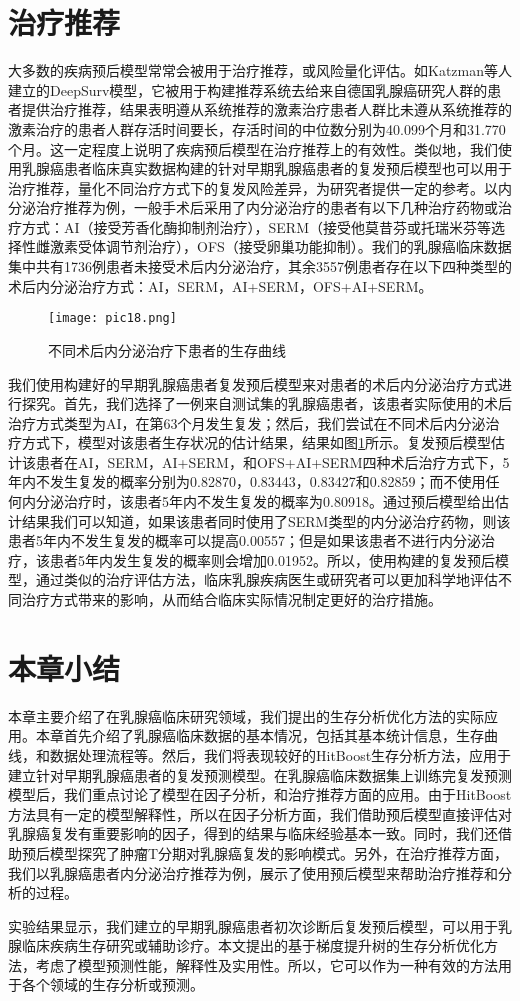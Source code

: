 \section{治疗推荐}
大多数的疾病预后模型常常会被用于治疗推荐，或风险量化评估。如Katzman等人 建立的DeepSurv模型，它被用于构建推荐系统去给来自德国乳腺癌研究人群的患者提供治疗推荐，结果表明遵从系统推荐的激素治疗患者人群比未遵从系统推荐的激素治疗的患者人群存活时间要长，存活时间的中位数分别为40.099个月和31.770个月。这一定程度上说明了疾病预后模型在治疗推荐上的有效性。类似地，我们使用乳腺癌患者临床真实数据构建的针对早期乳腺癌患者的复发预后模型也可以用于治疗推荐，量化不同治疗方式下的复发风险差异，为研究者提供一定的参考。以内分泌治疗推荐为例，一般手术后采用了内分泌治疗的患者有以下几种治疗药物或治疗方式：AI（接受芳香化酶抑制剂治疗），SERM（接受他莫昔芬或托瑞米芬等选择性雌激素受体调节剂治疗），OFS（接受卵巢功能抑制）。我们的乳腺癌临床数据集中共有1736例患者未接受术后内分泌治疗，其余3557例患者存在以下四种类型的术后内分泌治疗方式：AI，SERM，AI+SERM，OFS+AI+SERM。

\begin{figure}[H]
\texttt{[image: pic18.png]}
\caption{不同术后内分泌治疗下患者的生存曲线}
\label{pic18}
\end{figure}

我们使用构建好的早期乳腺癌患者复发预后模型来对患者的术后内分泌治疗方式进行探究。首先，我们选择了一例来自测试集的乳腺癌患者，该患者实际使用的术后治疗方式类型为AI，在第63个月发生复发；然后，我们尝试在不同术后内分泌治疗方式下，模型对该患者生存状况的估计结果，结果如图\ref{pic18}所示。复发预后模型估计该患者在AI，SERM，AI+SERM，和OFS+AI+SERM四种术后治疗方式下，5年内不发生复发的概率分别为0.82870，0.83443，0.83427和0.82859；而不使用任何内分泌治疗时，该患者5年内不发生复发的概率为0.80918。通过预后模型给出估计结果我们可以知道，如果该患者同时使用了SERM类型的内分泌治疗药物，则该患者5年内不发生复发的概率可以提高0.00557；但是如果该患者不进行内分泌治疗，该患者5年内发生复发的概率则会增加0.01952。所以，使用构建的复发预后模型，通过类似的治疗评估方法，临床乳腺疾病医生或研究者可以更加科学地评估不同治疗方式带来的影响，从而结合临床实际情况制定更好的治疗措施。

\section{本章小结}

本章主要介绍了在乳腺癌临床研究领域，我们提出的生存分析优化方法的实际应用。本章首先介绍了乳腺癌临床数据的基本情况，包括其基本统计信息，生存曲线，和数据处理流程等。然后，我们将表现较好的HitBoost生存分析方法，应用于建立针对早期乳腺癌患者的复发预测模型。在乳腺癌临床数据集上训练完复发预测模型后，我们重点讨论了模型在因子分析，和治疗推荐方面的应用。由于HitBoost方法具有一定的模型解释性，所以在因子分析方面，我们借助预后模型直接评估对乳腺癌复发有重要影响的因子，得到的结果与临床经验基本一致。同时，我们还借助预后模型探究了肿瘤T分期对乳腺癌复发的影响模式。另外，在治疗推荐方面，我们以乳腺癌患者内分泌治疗推荐为例，展示了使用预后模型来帮助治疗推荐和分析的过程。

实验结果显示，我们建立的早期乳腺癌患者初次诊断后复发预后模型，可以用于乳腺临床疾病生存研究或辅助诊疗。本文提出的基于梯度提升树的生存分析优化方法，考虑了模型预测性能，解释性及实用性。所以，它可以作为一种有效的方法用于各个领域的生存分析或预测。
